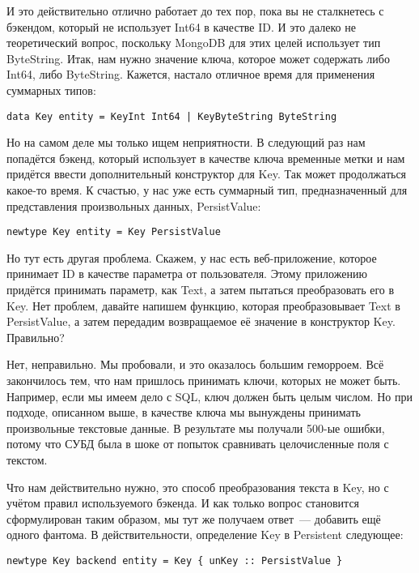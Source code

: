 И это действительно отлично работает до тех пор, пока вы не сталкнетесь с бэкендом, который не использует Int64 в качестве ID. И это далеко не теоретический вопрос, поскольку MongoDB для этих целей использует тип ByteString. Итак, нам нужно значение ключа, которое может содержать либо Int64, либо ByteString. Кажется, настало отличное время для применения суммарных типов:

\begin{lstlisting}
data Key entity = KeyInt Int64 | KeyByteString ByteString
\end{lstlisting}

Но на самом деле мы только ищем неприятности. В следующий раз нам попадётся бэкенд, который использует в качестве ключа временные метки и нам придётся ввести дополнительный конструктор для Key. Так может продолжаться какое-то время. К счастью, у нас уже есть суммарный тип, предназначенный для представления произвольных данных, PersistValue:

\begin{lstlisting}
newtype Key entity = Key PersistValue
\end{lstlisting}

Но тут есть другая проблема. Скажем, у нас есть веб-приложение, которое принимает ID в качестве параметра от пользователя. Этому приложению придётся принимать параметр, как Text, а затем пытаться преобразовать его в Key. Нет проблем, давайте напишем функцию, которая преобразовывает Text в PersistValue, а затем передадим возвращаемое её значение в конструктор Key. Правильно?

Нет, неправильно. Мы пробовали, и это оказалось большим геморроем. Всё закончилось тем, что нам пришлось принимать ключи, которых не может быть. Например, если мы имеем дело с SQL, ключ должен быть целым числом. Но при подходе, описанном выше, в качестве ключа мы вынуждены принимать произвольные текстовые данные. В результате мы получали 500-ые ошибки, потому что СУБД была в шоке от попыток сравнивать целочисленные поля с текстом.

Что нам действительно нужно, это способ преобразования текста в Key, но с учётом правил используемого бэкенда. И как только вопрос становится сформулирован таким образом, мы тут же получаем ответ~--- добавить ещё одного фантома. В действительности, определение Key в Persistent следующее:

\begin{lstlisting}
newtype Key backend entity = Key { unKey :: PersistValue }
\end{lstlisting}

